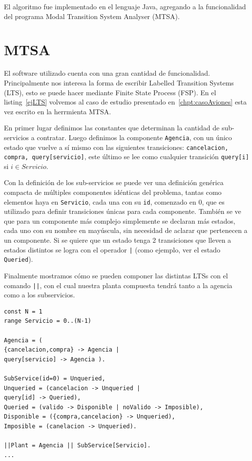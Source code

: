 
El algoritmo fue implementado en el lenguaje Java, agregando a la funcionalidad del programa Modal Transition System Analyser (MTSA)\cite{mtsaRepo}.

\section{MTSA}
El software utilizado cuenta con una gran cantidad de funcionalidad. Principalmente nos interesa la forma de escribir Labelled Transition Systems (LTS), esto se puede hacer mediante Finite State Process (FSP). En el listing~\ref{ejLTS} volvemos al caso de estudio presentado en~\ref{chpt:casoAviones} esta vez escrito en la herrmienta MTSA.

En primer lugar definimos las constantes que determinan la cantidad de sub-servicios a contratar. Luego definimos la componente \texttt{Agencia}, con un único estado que vuelve a sí mismo con las siguientes transiciones: \texttt{cancelacion, compra, query[servicio]}, este último se lee como cualquier transición \texttt{query[i]} si $i \in Servicio$.

Con la definición de los sub-servicios se puede ver una definición genérica compacta de múltiples componentes idénticas del problema, tantas como elementos haya en \texttt{Servicio}, cada una con su \texttt{id}, comenzado en 0, que es utilizado para definir transiciones únicas para cada componente. También se ve que para un componente más complejo simplemente se declaran más estados, cada uno con su nombre en mayúscula, sin necesidad de aclarar que pertenecen a un componente. Si se quiere que un estado tenga 2 transiciones que lleven a estados distintos se logra con el operador \texttt{|} (como ejemplo, ver el estado \texttt{Queried}).

Finalmente mostramos cómo se pueden componer las distintas LTSs con el comando \texttt{||}, con el cual nuestra planta compuesta tendrá tanto a la agencia como a los subservicios.

\begin{lstlisting}[language = mtsa, caption=Ejemplo de LTS y composición, label=ejLTS]
const N = 1
range Servicio = 0..(N-1)

Agencia = (
{cancelacion,compra} -> Agencia |
query[servicio] -> Agencia ).

SubService(id=0) = Unqueried,
Unqueried = (cancelacion -> Unqueried |
query[id] -> Queried),
Queried = (valido -> Disponible | noValido -> Imposible),
Disponible = ({compra,cancelacion} -> Unqueried),
Imposible = (canelacion -> Unqueried).

||Plant = Agencia || SubService[Servicio].
...
\end{lstlisting}

